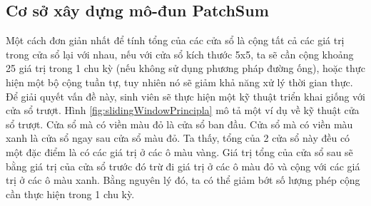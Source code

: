 \subsection{Cơ sở xây dựng mô-đun PatchSum}
Một cách đơn giản nhất để tính tổng của các cửa sổ là cộng tất cả các giá trị trong cửa sổ lại với nhau, nếu với cửa sổ kích thước 5x5, ta sẽ cần cộng khoảng 25 giá trị trong 1 chu kỳ (nếu không sử dụng phương pháp đường ống), hoặc thực hiện một bộ cộng tuần tự, tuy nhiên nó sẽ giảm khả năng xử lý thời gian thực. Để giải quyết vấn đề này, sinh viên sẽ thực hiện một kỹ thuật triển khai giống với cửa sổ trượt. Hình \ref{fig:slidingWindowPrincipla} mô tả một ví dụ về kỹ thuật cửa sổ trượt. Cửa sổ mà có viền màu đỏ là cửa sổ ban đầu. Cửa sổ mà có viền màu xanh là cửa sổ ngay sau cửa sổ màu đỏ. Ta thấy, tổng của 2 cửa sổ này đều có một đặc điểm là có các giá trị ở các ô màu vàng. Giá trị tổng của cửa sổ sau sẽ bằng giá trị của cửa sổ trước đó trừ đi giá trị ở các ô màu đỏ và cộng với các giá trị ở các ô màu xanh. Bằng nguyên lý đó, ta có thể giảm bớt số lượng phép cộng cần thực hiện trong 1 chu kỳ.


